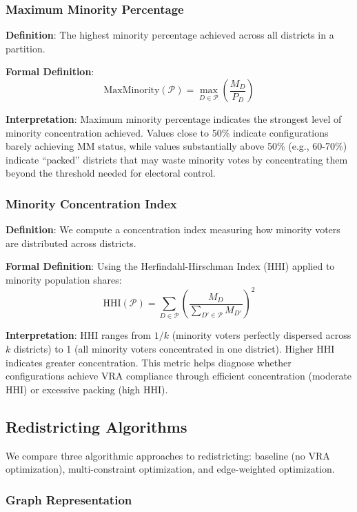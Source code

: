 \subsubsection{Maximum Minority Percentage}

\textbf{Definition}: The highest minority percentage achieved across all districts in a partition.

\textbf{Formal Definition}:
\[
\text{MaxMinority}(\mathcal{P}) = \max_{D \in \mathcal{P}} \left( \frac{M_D}{P_D} \right)
\]

\textbf{Interpretation}: Maximum minority percentage indicates the strongest level of minority concentration achieved. Values close to 50\% indicate configurations barely achieving MM status, while values substantially above 50\% (e.g., 60-70\%) indicate ``packed'' districts that may waste minority votes by concentrating them beyond the threshold needed for electoral control.

\subsubsection{Minority Concentration Index}

\textbf{Definition}: We compute a concentration index measuring how minority voters are distributed across districts.

\textbf{Formal Definition}: Using the Herfindahl-Hirschman Index (HHI) applied to minority population shares:
\[
\text{HHI}(\mathcal{P}) = \sum_{D \in \mathcal{P}} \left( \frac{M_D}{\sum_{D' \in \mathcal{P}} M_{D'}} \right)^2
\]

\textbf{Interpretation}: HHI ranges from $1/k$ (minority voters perfectly dispersed across $k$ districts) to 1 (all minority voters concentrated in one district). Higher HHI indicates greater concentration. This metric helps diagnose whether configurations achieve VRA compliance through efficient concentration (moderate HHI) or excessive packing (high HHI).

\subsection{Redistricting Algorithms}

We compare three algorithmic approaches to redistricting: baseline (no VRA optimization), multi-constraint optimization, and edge-weighted optimization.

\subsubsection{Graph Representation}

